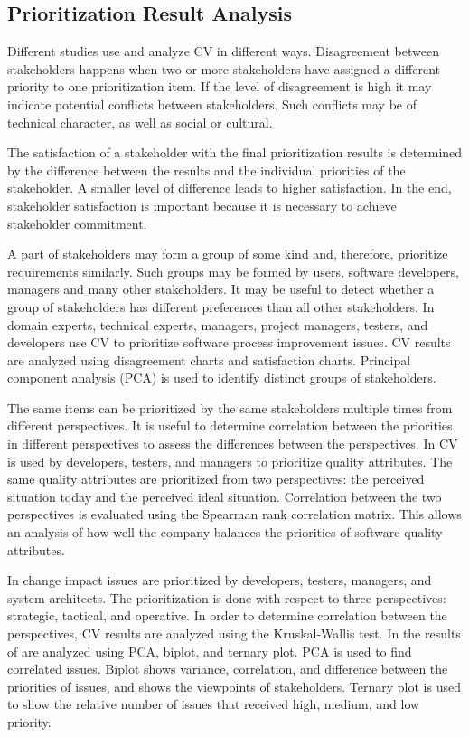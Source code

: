 \subsection{Prioritization Result Analysis}

Different studies use and analyze CV in different ways. Disagreement
between stakeholders happens when two or more stakeholders have assigned
a different priority to one prioritization item. If the level of disagreement
is high it may indicate potential conflicts between stakeholders.
Such conflicts may be of technical character, as well as social or cultural.

The satisfaction of a stakeholder with the final prioritization results is
determined by the difference between the results and the individual priorities
of the stakeholder. A smaller level of difference leads to higher satisfaction.
In the end, stakeholder satisfaction is important because it is necessary to achieve
stakeholder commitment.

A part of stakeholders may form a group of some kind and, therefore, prioritize
requirements similarly. Such groups may be formed by users, software
developers, managers and many other stakeholders. It may be useful
to detect whether a group of stakeholders has different preferences
than all other stakeholders. In \citep{Pettersson2008} domain experts,
technical experts, managers, project managers, testers, and developers
use CV to prioritize software process improvement issues. CV results
are analyzed using disagreement charts and satisfaction charts.
Principal component analysis (PCA) is used to identify distinct
groups of stakeholders.

The same items can be prioritized by the same stakeholders multiple times
from different perspectives. It is useful to determine correlation between
the priorities in different perspectives to assess the differences
between the perspectives. In \citep{Barney2009b} CV is used by developers,
testers, and managers to prioritize quality attributes. The same quality
attributes are prioritized from two perspectives: the perceived situation
today and the perceived ideal situation. Correlation between the two perspectives
is evaluated using the Spearman rank correlation matrix. This allows an analysis of
how well the company balances the priorities of software quality attributes.

In \citep{Jonsson2005} change impact issues are prioritized by developers,
testers, managers, and system architects. The prioritization is done
with respect to three perspectives: strategic, tactical, and operative.
In order to determine correlation between the perspectives, CV results are
analyzed using the Kruskal-Wallis test. In \citep{Chatzipetrou2010} the
results of \citep{Jonsson2005} are analyzed using PCA, biplot, and
ternary plot. PCA is used to find correlated issues.
Biplot shows variance, correlation, and difference between
the priorities of issues, and shows the viewpoints of stakeholders. Ternary
plot is used to show the relative number of issues that received high,
medium, and low priority.
